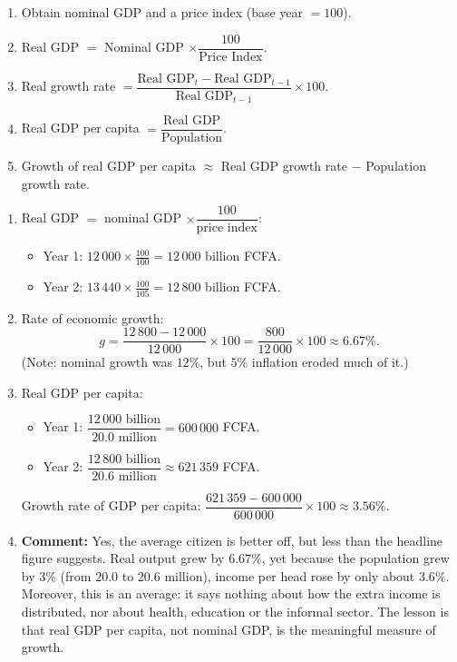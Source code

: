 \documentclass[11pt]{article}
\begin{document}
\begin{methode}
\begin{enumerate}
\item Obtain nominal GDP and a price index (base year $=100$).
\item Real GDP $=$ Nominal GDP $\times \dfrac{100}{\text{Price Index}}$.
\item Real growth rate $= \dfrac{\text{Real GDP}_t - \text{Real GDP}_{t-1}}{\text{Real GDP}_{t-1}} \times 100$.
\item Real GDP per capita $= \dfrac{\text{Real GDP}}{\text{Population}}$.
\item Growth of real GDP per capita $\approx$ Real GDP growth rate $-$ Population growth rate.
\end{enumerate}
\end{methode}

\begin{corrige}
\begin{enumerate}
\item Real GDP $=$ nominal GDP $\times \dfrac{100}{\text{price index}}$:
\begin{itemize}
\item Year 1: $12\,000 \times \frac{100}{100} = 12\,000$ billion FCFA.
\item Year 2: $13\,440 \times \frac{100}{105} = 12\,800$ billion FCFA.
\end{itemize}
\item Rate of economic growth:
\[ g = \frac{12\,800 - 12\,000}{12\,000}\times 100 = \frac{800}{12\,000}\times 100 \approx 6.67\%. \]
(Note: nominal growth was $12\%$, but $5\%$ inflation eroded much of it.)
\item Real GDP per capita:
\begin{itemize}
\item Year 1: $\dfrac{12\,000\text{ billion}}{20.0\text{ million}} = 600\,000$ FCFA.
\item Year 2: $\dfrac{12\,800\text{ billion}}{20.6\text{ million}} \approx 621\,359$ FCFA.
\end{itemize}
Growth rate of GDP per capita: $\dfrac{621\,359 - 600\,000}{600\,000}\times 100 \approx 3.56\%$.
\item \textbf{Comment:} Yes, the average citizen is better off, but less than the headline figure suggests. Real output grew by $6.67\%$, yet because the population grew by $3\%$ (from $20.0$ to $20.6$ million), income per head rose by only about $3.6\%$. Moreover, this is an average: it says nothing about how the extra income is distributed, nor about health, education or the informal sector. The lesson is that real GDP per capita, not nominal GDP, is the meaningful measure of growth.
\end{enumerate}
\end{corrige}
\end{document}
